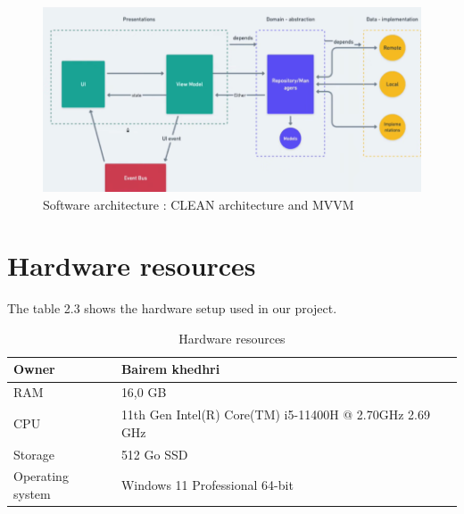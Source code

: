 \begin{figure}[H] 
            \centering
            \includegraphics[scale=0.8]{mvm.png}
            \caption{Software architecture : CLEAN architecture and MVVM } 
            \label{fig: CLEAN architecture and MVVM}
\end{figure}

\section{Hardware resources}
The table 2.3 shows the hardware setup used in our project.
\begin{table}[H]
    \centering
    \begin{tabular}{|p{4cm}|p{6cm}|}
        \hline
        Owner & Bairem khedhri\\
        \hline
        RAM & 16,0 GB \\
        \hline
        CPU & 11th Gen Intel(R) Core(TM) i5-11400H @ 2.70GHz   2.69 GHz \\
        \hline
        Storage & 512 Go SSD \\
        \hline
        Operating system  & Windows 11 Professional 64-bit \\
        \hline
    \end{tabular}
    \caption{Hardware resources}
    \label{Tab: Hardware resources}
\end{table}

